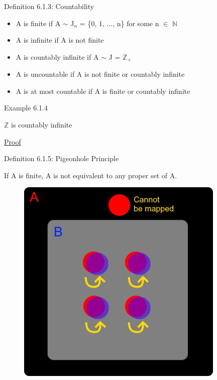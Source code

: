 { \color{blue} Definition 6.1.3: Countability } 
	\begin{itemize}[leftmargin=1cm, itemsep=0.1cm]
		\item A is {\color{lblue} finite} if A $\sim$ J$_n$ = \{0, 1, ..., n\}
			for some n $\in$ $\mathbb{N}$
		\item A is {\color{lblue} infinite} if A is not finite
		\item A is {\color{lblue} countably infinite} if A $\sim$ J = $\mathbb{Z}_+$
		\item A is {\color{lblue} uncountable} if A is not finite or countably infinite
		\item A is {\color{lblue} at most countable} if A is finite or countably infinite \\
	\end{itemize}

{ \color{purple} Example 6.1.4 } 

	\qquad $\mathbb{Z}$ is countably infinite

{ \color{magenta} \underline{Proof} }


\newpage

{ \color{blue} Definition 6.1.5: Pigeonhole Principle } 

	\qquad If A is finite, A is not equivalent to any proper set of A.

	\begin{figure}[h]
	\centering
	\includegraphics[scale=0.5]{Images/6.1.5.png}
\end{figure}

